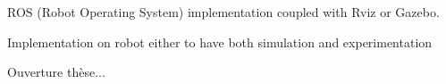 \documentclass[../main.tex]{subfiles}
\begin{document}
ROS (Robot Operating System) implementation coupled with Rviz or Gazebo. 

Implementation on robot either to have both simulation and experimentation 




Ouverture thèse...
\end{document}
